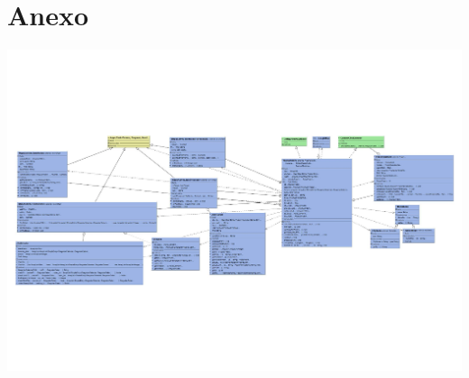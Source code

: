 \chapter*{Anexo}
{%
	\label{fig:anexo_diagrama_main_activity}
	\centering
	\includegraphics[angle=90]{imagenes/main_activity_class_diagram.pdf}
	\par
}
\restoregeometry
